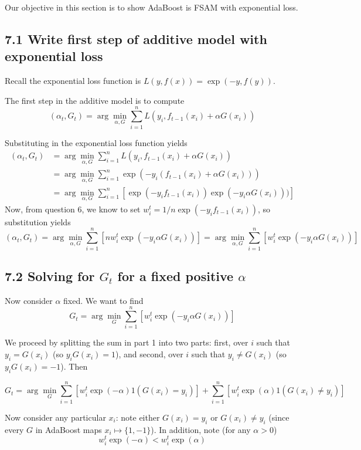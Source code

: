 \documentclass[paper=a4, fontsize=11pt]{scrartcl} %
\numberwithin{equation}{section} %
\numberwithin{figure}{section} %
\numberwithin{table}{section} %
\begin{document}
Our objective in this section is to show AdaBoost is FSAM with exponential loss. 

\subsection*{7.1 Write first step of additive model with exponential loss}

Recall the exponential loss function is $L(y, f(x)) = \exp(-y, f(y))$.

The first step in the additive model is to compute
\[
(\alpha_t, G_t) = \arg \min_{\alpha, G} \sum_{i = 1}^n L(y_i, f_{t-1}(x_i) + \alpha G(x_i))\]

Substituting in the exponential loss function yields
\begin{align*}
(\alpha_t, G_t) &= \arg \min_{\alpha, G} \sum_{i = 1}^n L(y_i, f_{t-1}(x_i) + \alpha G(x_i))\\
&= \arg \min_{\alpha, G} \sum_{i = 1}^n \exp(-y_i (f_{t-1}(x_i) + \alpha G(x_i)))\\
&= \arg \min_{\alpha, G} \sum_{i = 1}^n \left[ \exp(-y_i f_{t-1}(x_i)) \exp(-y_i \alpha G(x_i))) \right]
\end{align*}
Now, from question 6, we know to set $w_i^{t} = 1/n \exp(-y_i f_{t-1}(x_i))$, so substitution yields
\[(\alpha_t, G_t) = \arg \min_{\alpha, G} \sum_{i = 1}^n \left[n w_i^t \exp(-y_i \alpha G(x_i))\right] = \arg \min_{\alpha, G} \sum_{i = 1}^n \left[w_i^t \exp(-y_i \alpha G(x_i))\right] \]

\subsection*{7.2 Solving for $G_t$ for a fixed positive $\alpha$}

Now consider $\alpha$ fixed. We want to find
\[ G_t = \arg \min_{G} \sum_{i = 1}^n \left[w_i^t \exp(-y_i \alpha G(x_i))\right] \]

We proceed by splitting the sum in part 1 into two parts:  first, over $i$ such that $y_i = G(x_i)$ (so $y_i G(x_i) = 1$), and second, over $i$ such that $y_i \ne G(x_i)$ (so $y_i G(x_i) = -1$). Then

\[ G_t = \arg \min_{G} \sum_{i = 1}^n \left[w_i^t \exp(-\alpha) 1(G(x_i) = y_i)\right] + \sum_{i = 1}^n \left[w_i^t \exp(\alpha) 1(G(x_i) \ne y_i)\right] \]

Now consider any particular $x_i$: note either $G(x_i) = y_i$ or $G(x_i) \ne y_i$ (since every $G$ in AdaBoost maps $x_i 
\mapsto \{1, -1\}$). In addition, note (for any $\alpha > 0$)
\[w_i^t \exp(-\alpha) < w_i^t \exp(\alpha)\]
\end{document}
